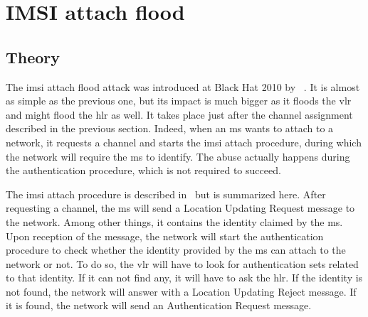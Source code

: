       \iffalse
      \begin{figure}
        \centering
        \texttt{[image: log\_dos\_rach4]}
        \caption{The MS sees Immediate Assignment messages with an RA
        of \code{0x00}, but discards them. Same in Wireshark.}
        \label{fig:log_dos_rach4}
      \end{figure}
      \fi
   
    \section{IMSI attach flood}

    \iffalse

http://www.etsi.org/deliver/etsi_ts/129000_129099/129002/12.07.00_60/ts_129002v120700p.pdf
look at page 480 for a flow diagram of the whole location update
procedure!!!


    \fi
      \subsection{Theory}

      The \gls{imsi} attach flood attack was introduced at Black Hat
      2010 by ~\cite{the_grugq_base_2010}. It is almost
      as simple as the previous one, but its impact is much bigger as it
      floods the \gls{vlr} and might flood the \gls{hlr} as well. It
      takes place just after the channel assignment described in the
      previous section. Indeed, when an \gls{ms} wants to attach to a
      network, it requests a channel and starts the \gls{imsi} attach
      procedure, during which the network will require the \gls{ms} to
      identify. The abuse actually happens during the authentication
      procedure, which is not required to succeed.

      The \gls{imsi} attach procedure is described
      in~ but is summarized here. After
      requesting a channel, the \gls{ms} will send a Location Updating
      Request message to the network. Among other things, it contains
      the identity claimed by the \gls{ms}. Upon reception of the
      message, the network will start the authentication procedure to
      check whether the identity provided by the \gls{ms} can attach to
      the network or not. To do so, the \gls{vlr} will have to look for
      authentication sets related to that identity. If it can not find
      any, it will have to ask the \gls{hlr}. If the identity is not
      found, the network will answer with a Location Updating Reject
      message. If it is found, the network will send an Authentication
      Request message.

